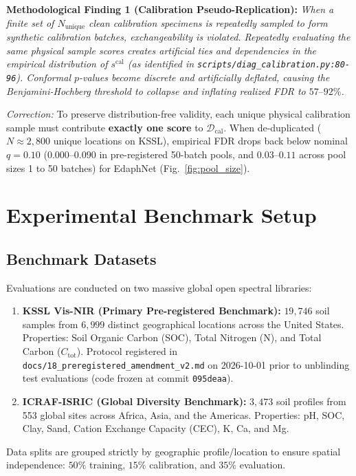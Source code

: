 \documentclass[journal,twoside]{IEEEtran}
\begin{document}
\textbf{Methodological Finding 1 (Calibration Pseudo-Replication):} \emph{When a finite set of $N_{\text{unique}}$ clean calibration specimens is repeatedly sampled to form synthetic calibration batches, exchangeability is violated. Repeatedly evaluating the same physical sample scores creates artificial ties and dependencies in the empirical distribution of $s^{\text{cal}}$ (as identified in \texttt{scripts/diag\_calibration.py:80-96}). Conformal $p$-values become discrete and artificially deflated, causing the Benjamini-Hochberg threshold to collapse and inflating realized FDR to $57\text{--}92\%$.}

\emph{Correction:} To preserve distribution-free validity, each unique physical calibration sample must contribute \textbf{exactly one score} to $\mathcal{D}_{\text{cal}}$. When de-duplicated ($N \approx 2{,}800$ unique locations on KSSL), empirical FDR drops back below nominal $q = 0.10$ ($0.000\text{--}0.090$ in pre-registered 50-batch pools, and $0.03\text{--}0.11$ across pool sizes 1 to 50 batches) for EdaphNet (Fig.~\ref{fig:pool_size}).

\section{Experimental Benchmark Setup}

\subsection{Benchmark Datasets}
Evaluations are conducted on two massive global open spectral libraries:
\begin{enumerate}
    \item \textbf{KSSL Vis-NIR (Primary Pre-registered Benchmark):} $19{,}746$ soil samples from $6{,}999$ distinct geographical locations across the United States. Properties: Soil Organic Carbon (SOC), Total Nitrogen (N), and Total Carbon ($C_{\text{tot}}$). Protocol registered in \texttt{docs/18\_preregistered\_amendment\_v2.md} on 2026-10-01 prior to unblinding test evaluations (code frozen at commit \texttt{095deaa}).
    \item \textbf{ICRAF-ISRIC (Global Diversity Benchmark):} $3{,}473$ soil profiles from 553 global sites across Africa, Asia, and the Americas. Properties: pH, SOC, Clay, Sand, Cation Exchange Capacity (CEC), K, Ca, and Mg.
\end{enumerate}
Data splits are grouped strictly by geographic profile/location to ensure spatial independence: $50\%$ training, $15\%$ calibration, and $35\%$ evaluation.
\end{document}
